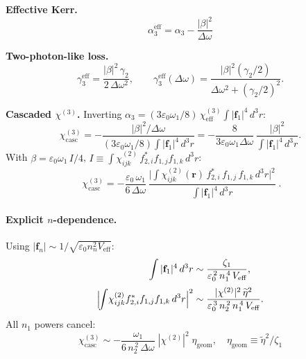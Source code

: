 \documentclass[11pt,a4paper]{article}
\newcommand{\eps}{\varepsilon}
\newcommand{\bvec}[1]{\mathbf{#1}}
\newcommand{\f}{\bvec{f}}
\newcommand{\ri}{\bvec{r}}
\newcommand{\dthreer}{\,d^{3}r}
\newcommand{\chitwo}{\chi^{(2)}}
\newcommand{\chithree}{\chi^{(3)}}
\newcommand{\Dom}{\Delta\omega}
\begin{document}
\textbf{Effective Kerr.}
\begin{equation}
  \boxed{\;\alpha_3^{\text{eff}}=\alpha_3-\frac{|\beta|^2}{\Dom}\;}
\end{equation}

\textbf{Two-photon-like loss.}
\begin{equation}
  \gamma_3^\text{eff}=\frac{|\beta|^{2}\,\gamma_2}{2\,\Dom^{2}},
  \qquad
  \gamma_3^\text{eff}(\Dom)=\frac{|\beta|^{2}(\gamma_2/2)}{\Dom^{2}+(\gamma_2/2)^{2}}.
  \label{eq:gamma3-adiab}
\end{equation}

\textbf{Cascaded $\chithree$.} Inverting $\alpha_3=(3\eps_0\omega_1/8)\,\chithree_\text{eff}\!\int|\f_1|^4\dthreer$:
\begin{equation}
  \chithree_{\text{casc}}=-\frac{|\beta|^2/\Dom}{(3\eps_0\omega_1/8)\!\int\!|\f_1|^4\dthreer}
                      =-\frac{8}{3\eps_0\omega_1\Dom}\,
                           \frac{|\beta|^2}{\int|\f_1|^4\dthreer}.
\end{equation}
With $\beta=\eps_0\omega_1\,I/4$, $I\equiv\int\chitwo_{ijk}\,f_{2,i}^*f_{1,j}f_{1,k}\dthreer$:
\begin{equation}
  \boxed{\;\chithree_{\text{casc}}=-\frac{\eps_0\,\omega_1}{6\,\Dom}\,
       \frac{\bigl|\!\int\!\chitwo_{ijk}(\ri)\,f_{2,i}^*\,f_{1,j}\,f_{1,k}\dthreer\bigr|^{2}}
            {\int|\f_1|^4\dthreer}\;.}
\label{eq:chi3casc}
\end{equation}

\paragraph{Explicit $n$-dependence.} Using $|\f_n|\sim 1/\sqrt{\eps_0 n_n^2 V_\text{eff}}$:
\begin{align}
  \int|\f_1|^4\dthreer&\sim\frac{\zeta_1}{\eps_0^{\,2}\,n_1^{\,4}\,V_\text{eff}},
  \\[2pt]
  \Bigl|\!\int\!\chitwo_{ijk}f_{2,i}^*f_{1,j}f_{1,k}\dthreer\Bigr|^{2}
        &\sim\frac{|\chitwo|^{2}\,\widetilde\eta^{2}}{\eps_0^{\,3}\,n_2^{\,2}\,n_1^{\,4}\,V_\text{eff}}.
\end{align}
All $n_1$ powers cancel:
\begin{equation}
  \boxed{\;\chithree_{\text{casc}}\sim-\frac{\omega_1}{6\,n_2^{\,2}\,\Dom}\;|\chitwo|^{2}\;\eta_\text{geom},
        \quad \eta_\text{geom}\equiv\widetilde\eta^{2}/\zeta_1\;}
\label{eq:chi3casc_explicit}
\end{equation}
\end{document}
